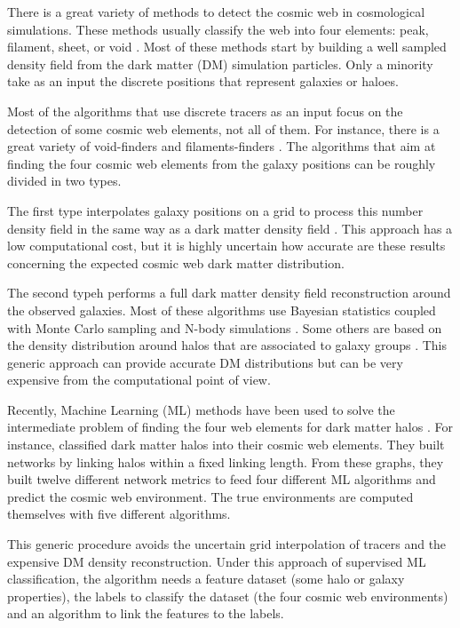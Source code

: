 \documentclass[usenatbib]{mnras}
\begin{document}
There is a great variety of methods to detect
the cosmic web in cosmological simulations.
These methods usually classify the web into four
elements: peak, filament, sheet, or void \citep{Libeskind2018}.
Most of these methods start by building a well sampled density field
from the dark matter (DM) simulation particles.
Only a minority take as an input the discrete  positions that
represent galaxies or haloes.

Most of the algorithms that use discrete tracers as an input focus on
the detection of some cosmic web elements, not all of them. 
For instance, there is a great variety of void-finders
\citep{Platen2007,Neyrinck2008} and filaments-finders
\citep{Novikov2003,Zhang2009,Sousbie2010,Chen2015,Luber2019}.   
The algorithms that aim at finding the four cosmic web elements from
the galaxy positions can be roughly divided in two types.

The first type interpolates galaxy positions on a grid to process
this number density field in the same way as a dark matter density
field \citep{Eardley2015,Alpaslan2016,Tojeiro2017,Shadab2019}.
This approach has a low computational cost, but it is highly uncertain
how accurate are these results concerning the expected cosmic
web dark matter distribution.

The second typeh performs a full dark matter density field
reconstruction around the observed galaxies.
Most of these algorithms use Bayesian statistics coupled with Monte
Carlo sampling and N-body
simulations \citep{Jasche2010,Jasche2013a,Bos2014,LeclercqJasche2015,Horowitz2019,Burchett2020}. 
Some others are based on the density distribution around halos that
are associated to galaxy groups \citep{Wang2009,2011MNRAS.417.1303M}.  
This generic approach can provide accurate DM distributions but can
be very expensive from the computational point of view. 

Recently, Machine Learning (ML) methods have been used to solve the
intermediate problem of finding the four web elements for dark matter 
halos \citep{Hui2018,Tsizh2019}.
For instance, \citep{Tsizh2019} classified
dark matter halos into their cosmic web elements. 
They built networks by linking halos within a fixed linking length.
From these graphs, they built twelve different network metrics to feed
four different ML algorithms and predict the cosmic web
environment. 
The true environments are computed themselves with five different algorithms.  

This generic procedure avoids the uncertain grid interpolation of
tracers and the expensive DM density reconstruction. 
Under this approach of supervised ML classification, 
the algorithm needs a feature dataset (some halo or galaxy
properties), the labels to classify the dataset (the four cosmic web
environments) and an algorithm to link the features to the labels.
\end{document}
